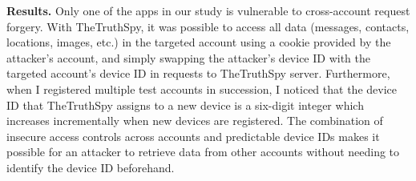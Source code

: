 
\textbf{Results.}  Only one of the apps in our study is vulnerable to
cross-account request forgery.
With TheTruthSpy, it was possible to
access all data (messages, contacts, locations, images, etc.)  in the
targeted account using a cookie provided by the attacker's account,
and simply swapping the attacker's device ID with the targeted
account's device ID in requests to TheTruthSpy server.  Furthermore,
when I registered multiple test accounts in succession, I noticed
that the device ID that TheTruthSpy assigns to a new device is a six-digit
integer which increases incrementally when new devices are registered.
The combination of insecure access controls across accounts and
predictable device IDs makes it possible for an attacker to retrieve
data from other accounts without needing to identify the device ID
beforehand.


